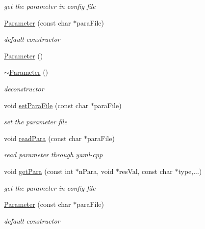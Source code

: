 \begin{DoxyCompactItemize}
\begin{DoxyCompactList}\small\item\em get the parameter in config file \item\end{DoxyCompactList}\item 
\hyperlink{classHSF_1_1Parameter_a99364861f624da340a461c0226bcca63}{Parameter} (const char $\ast$paraFile)
\begin{DoxyCompactList}\small\item\em default constructor \item\end{DoxyCompactList}\item 
\hyperlink{classHSF_1_1Parameter_a6c1b209f15999e6ddf19d756adbdbae8}{Parameter} ()
\item 
\hyperlink{classHSF_1_1Parameter_ac59ca61eccd3d1e8ad38133c06ea8178}{$\sim$Parameter} ()
\begin{DoxyCompactList}\small\item\em deconstructor \item\end{DoxyCompactList}\item 
void \hyperlink{classHSF_1_1Parameter_a535c67d4b12636e498b98d3e6f0723d1}{setParaFile} (const char $\ast$paraFile)
\begin{DoxyCompactList}\small\item\em set the parameter file \item\end{DoxyCompactList}\item 
void \hyperlink{classHSF_1_1Parameter_a1701a921961849020f7dcd6bf2a8d150}{readPara} (const char $\ast$paraFile)
\begin{DoxyCompactList}\small\item\em read parameter through yaml-\/cpp \item\end{DoxyCompactList}\item 
void \hyperlink{classHSF_1_1Parameter_a43cde4ecf939bca66b2dae7566eea056}{getPara} (const int $\ast$nPara, void $\ast$resVal, const char $\ast$type,...)
\begin{DoxyCompactList}\small\item\em get the parameter in config file \item\end{DoxyCompactList}\item 
\hyperlink{classHSF_1_1Parameter_a99364861f624da340a461c0226bcca63}{Parameter} (const char $\ast$paraFile)
\begin{DoxyCompactList}\small\item\em default constructor \item\end{DoxyCompactList}\item 

\end{DoxyCompactItemize}
